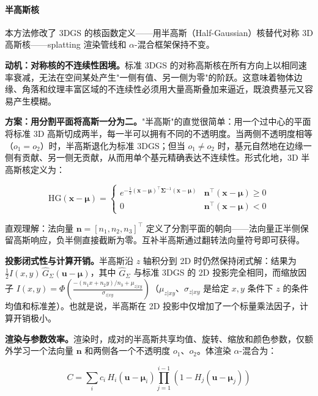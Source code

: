 \paragraph{半高斯核}

本方法修改了 3DGS 的核函数定义——用半高斯（Half-Gaussian）核替代对称 3D 高斯核——splatting 渲染管线和 $\alpha$-混合框架保持不变。

\textbf{动机：对称核的不连续性困境。}标准 3DGS 的对称高斯核在所有方向上以相同速率衰减，无法在空间某处产生"一侧有值、另一侧为零"的阶跃。这意味着物体边缘、角落和纹理丰富区域的不连续性必须用大量高斯叠加来逼近，既浪费基元又容易产生模糊。

\textbf{方案：用分割平面将高斯一分为二。}"半高斯"的直觉很简单：用一个过中心的平面将标准 3D 高斯切成两半，每一半可以拥有不同的不透明度。当两侧不透明度相等（$o_1 = o_2$）时，半高斯退化为标准 3DGS；但当 $o_1 \neq o_2$ 时，基元自然地在边缘一侧有贡献、另一侧无贡献，从而用单个基元精确表达不连续性。形式化地，3D 半高斯核定义为：

\begin{equation}
\text{HG}(\mathbf{x}-\boldsymbol{\mu}) = \begin{cases} e^{-\frac{1}{2}(\mathbf{x}-\boldsymbol{\mu})^\top \boldsymbol{\Sigma}^{-1}(\mathbf{x}-\boldsymbol{\mu})} & \mathbf{n}^\top(\mathbf{x} - \boldsymbol{\mu}) \geq 0 \\ 0 & \mathbf{n}^\top(\mathbf{x} - \boldsymbol{\mu}) < 0 \end{cases}
\end{equation}

直观理解：法向量 $\mathbf{n} = [n_1, n_2, n_3]^\top$ 定义了分割平面的朝向——法向量正半侧保留高斯响应，负半侧直接截断为零。互补半高斯通过翻转法向量符号即可获得。

\textbf{投影闭式性与计算开销。}半高斯沿 $z$ 轴积分到 2D 时仍然保持闭式解：结果为 $\frac{1}{2} I(x,y)\, \hat{G}_\Sigma(\mathbf{u}-\boldsymbol{\mu})$，其中 $\hat{G}_\Sigma$ 与标准 3DGS 的 2D 投影完全相同，而缩放因子 $I(x,y) = \Phi\!\left(\frac{-(n_1 x + n_2 y)/n_3 + \mu_{z|xy}}{\sigma_{z|xy}}\right)$（$\mu_{z|xy}$、$\sigma_{z|xy}$ 是给定 $x,y$ 条件下 $z$ 的条件均值和标准差）。也就是说，半高斯在 2D 投影中仅增加了一个标量乘法因子，计算开销极小。

\textbf{渲染与参数效率。}渲染时，成对的半高斯共享均值、旋转、缩放和颜色参数，仅额外学习一个法向量 $\mathbf{n}$ 和两侧各一个不透明度 $o_1$、$o_2$。体渲染 $\alpha$-混合为：

\begin{equation}
C = \sum_i c_i \, H_i(\mathbf{u}-\boldsymbol{\mu}_i) \prod_{j=1}^{i-1}(1 - H_j(\mathbf{u}-\boldsymbol{\mu}_j))
\end{equation}


